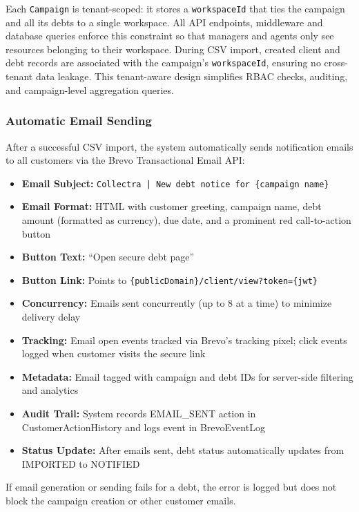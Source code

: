 \documentclass[12pt,a4paper]{report}
\begin{document}
Each \texttt{Campaign} is tenant-scoped: it stores a \texttt{workspaceId} that ties the campaign and all its debts to a single workspace. All API endpoints, middleware and database queries enforce this constraint so that managers and agents only see resources belonging to their workspace. During CSV import, created client and debt records are associated with the campaign's \texttt{workspaceId}, ensuring no cross-tenant data leakage. This tenant-aware design simplifies RBAC checks, auditing, and campaign-level aggregation queries.


\subsubsection{Automatic Email Sending}

After a successful CSV import, the system automatically sends notification emails to all customers via the Brevo Transactional Email API:

\begin{itemize}
  \item \textbf{Email Subject:} \texttt{Collectra | New debt notice for \{campaign name\}}
  \item \textbf{Email Format:} HTML with customer greeting, campaign name, debt amount (formatted as currency), due date, and a prominent red call-to-action button
  \item \textbf{Button Text:} ``Open secure debt page''
  \item \textbf{Button Link:} Points to \texttt{\{publicDomain\}/client/view?token=\{jwt\}}
  \item \textbf{Concurrency:} Emails sent concurrently (up to 8 at a time) to minimize delivery delay
  \item \textbf{Tracking:} Email open events tracked via Brevo's tracking pixel; click events logged when customer visits the secure link
  \item \textbf{Metadata:} Email tagged with campaign and debt IDs for server-side filtering and analytics
  \item \textbf{Audit Trail:} System records EMAIL\_SENT action in CustomerActionHistory and logs event in BrevoEventLog
  \item \textbf{Status Update:} After emails sent, debt status automatically updates from IMPORTED to NOTIFIED
\end{itemize}

If email generation or sending fails for a debt, the error is logged but does not block the campaign creation or other customer emails.
\end{document}
